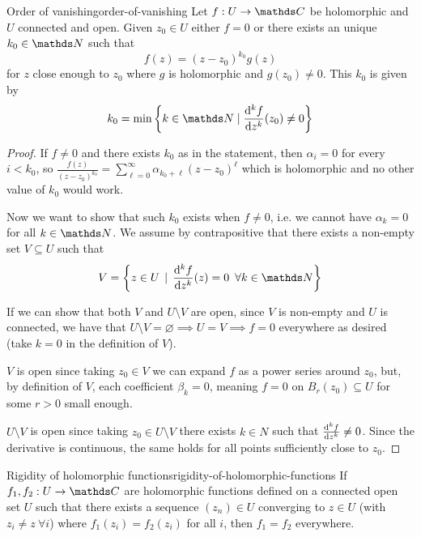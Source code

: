 \documentclass[12pt]{extarticle}
\numberwithin{equation}{subsection}
\begin{document}
\begin{theorem}{Order of vanishing}{order-of-vanishing}
	Let $f: U \to \C$ be holomorphic and $U$ connected and open.
	Given $z_0 \in U$ either $f = 0$ or there exists an unique $k_0 \in \N$ such that
	\begin{equation}
		f(z) = (z-z_0)^{k_0} g(z)
	\end{equation}
	for $z$ close enough to $z_0$ where $g$ is holomorphic and $g(z_0) \neq 0$.
	This $k_0$ is given by
	\begin{equation}
		k_0 = \min \left\{ k \in \N \mid \dv[k]{f}{z}()(z_0) \neq 0 \right\}
	\end{equation}
\end{theorem}

\begin{proof}
	If $f \neq 0$ and there exists $k_0$ as in the statement, then $\alpha_i = 0$ for every $i < k_0$,
	so $\frac{f(z)}{(z-z_0)^{k_0}} = \sum_{\ell = 0}^\infty \alpha_{k_0+\ell} (z - z_0)^\ell$ which is
	holomorphic and no other value of $k_0$ would work.

	Now we want to show that such $k_0$ exists when $f \neq 0$, i.e. we cannot have $\alpha_k = 0$ for
	all $k \in \N$. We assume by contrapositive that there exists a non-empty set $V \subseteq U$ such
	that
	\begin{equation}
		V = \left\{ z \in U \, \mid \, \dv[k]{f}{z}()(z) = 0 \enspace \forall k \in \N \right\}
	\end{equation}

	If we can show that both $V$ and $U \setminus V$ are open, since $V$ is non-empty and $U$ is
	connected, we have that $U \setminus V = \varnothing \implies U = V \implies f = 0$ everywhere as
	desired (take $k = 0$ in the definition of $V$).

	$V$ is open since taking $z_0 \in V$ we can expand $f$ as a power series around $z_0$, but, by
	definition of $V$, each coefficient $\beta_k = 0$, meaning $f = 0$ on $B_r(z_0) \subseteq U$ for
	some $r > 0$ small enough.

	$U \setminus V$ is open since taking $z_0 \in U \setminus V$ there exists $k \in N$ such that
	$\dv[k]{f}{z} \neq 0$. Since the derivative is continuous, the same holds for all points
	sufficiently close to $z_0$.
\end{proof}

\begin{theorem}{Rigidity of holomorphic functions}{rigidity-of-holomorphic-functions}
	If $f_1, f_2: U \to \C$ are holomorphic functions defined on a connected open set $U$ such that
	there exists a sequence $(z_n) \in U$ converging to $z \in U$ (with $z_i \neq z \ \forall i$)
	where $f_1(z_i) = f_2(z_i)$ for all $i$, then $f_1 = f_2$ everywhere.
\end{theorem}
\end{document}
